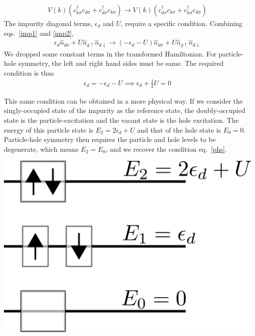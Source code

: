 \documentclass[twoside]{report}
\numberwithin{equation}{section}
\begin{document}
\begin{equation}\begin{aligned}
	V(k)\left(c^\dagger_{k\sigma}c_{d\sigma} + c^\dagger_{d\sigma}c_{k\sigma}\right)\to V(k)\left(c^\dagger_{d\sigma}c_{k\sigma} + c^\dagger_{k\sigma}c_{d\sigma}\right)
\end{aligned}\end{equation}
The impurity diagonal terms, \(\epsilon_d\) and \(U\), require a specific condition. Combining eqs.~\ref{imp1} and \ref{imp2},
\begin{equation}\begin{aligned}
	\epsilon_d\hat n_{d\sigma} + U\hat n_{d\uparrow}\hat n_{d\downarrow} \to \left(-\epsilon_d - U\right)\hat n_{d\sigma} + U\hat n_{d\uparrow}\hat n_{d\downarrow}
\end{aligned}\end{equation}
We dropped some constant terms in the transformed Hamiltonian. For particle-hole symmetry, the left and right hand sides must be same. The required condition is thus 
\begin{equation}\begin{aligned}
	\label{phs}
\epsilon_d = -\epsilon_d - U \implies \epsilon_d + \frac{1}{2} U = 0
\end{aligned}\end{equation}
\begin{minipage}{260pt}
    This same condition can be obtained in a more physical way. If we consider the singly-occupied state of the impurity as the reference state, the doubly-occupied state is the particle-excitation and the vacant state is the hole excitation. The energy of this particle state is \(E_2 = 2\epsilon_d + U\) and that of the hole state is \(E_0 = 0\). Particle-hole symmetry then requires the particle and hole levels to be degenerate, which means \(E_2 = E_0\), and we recover the condition eq.~\ref{phs}.
\end{minipage}
\hspace*{15pt}\begin{minipage}{200pt}
    \centering\includegraphics[scale=0.3]{phsymm.png}
\end{minipage}
\end{document}
